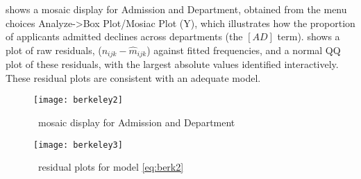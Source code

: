  shows a mosaic display for Admission and Department,
obtained from the menu choices \textsf{Analyze}->\textsf{Box Plot/Mosiac Plot (Y)},
which illustrates how the proportion of applicants admitted declines
across departments (the $[AD]$ term).
 shows a plot of raw residuals, ($n_{ijk} - \widehat{m}_{ijk}$) against fitted frequencies, and a normal QQ plot of these
residuals, with the largest absolute values identified interactively.
These residual plots  are consistent with an
adequate model.

\begin{figure}[htb]
  \centering
  \texttt{[image: berkeley2]}
  \caption{\INSIGHT\ mosaic display for Admission and Department}%
  \label{fig:berkeley2}
\end{figure}

\begin{figure}[htb]
  \centering
  \texttt{[image: berkeley3]}
  \caption{\INSIGHT\ residual plots for model \eqref{eq:berk2}}%
  \label{fig:berkeley3}
\end{figure}
